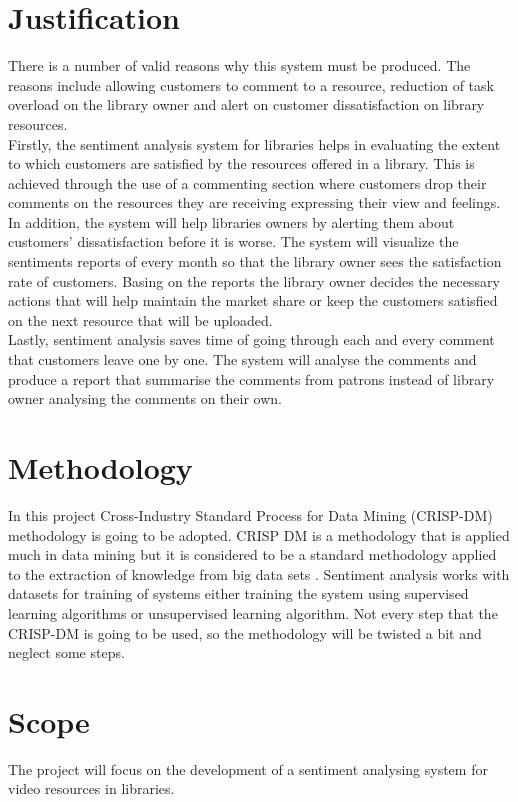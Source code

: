 \documentclass[12pt]{report}
\begin{document}
	\section{Justification}
	There is a number of valid reasons why this system must be produced. The reasons include allowing customers to comment to a resource, reduction of task overload on the library owner and alert on customer dissatisfaction on library resources.\\
	Firstly, the sentiment analysis system for libraries helps in evaluating the extent to which customers are satisfied by the resources offered in a library. This is achieved through the use of a commenting section where customers drop their comments on the resources they are receiving expressing their view and feelings.\\
	In addition, the system will help libraries owners by alerting them about customers’ dissatisfaction before it is worse. The system will visualize the sentiments reports of every month so that the library owner sees the satisfaction rate of customers. Basing on the reports the library owner decides the necessary actions that will help maintain the market share or keep the customers satisfied on the next resource that will be uploaded.\\
	Lastly, sentiment analysis saves time of going through each and every comment that customers leave one by one. The system will analyse the comments and produce a report that summarise the comments from patrons instead of library owner analysing the comments on their own.
	
	\section{Methodology}
	In this project Cross-Industry Standard Process for Data Mining (CRISP-DM) methodology is going to be adopted. CRISP DM is a methodology that is applied much in data mining but it is considered to be a standard methodology applied to the extraction of knowledge from big data sets \citep{sharda2016business}. Sentiment analysis works with datasets for training of systems either training the system using supervised learning algorithms or unsupervised learning algorithm. Not every step that the CRISP-DM is going to be used, so the methodology will be twisted a bit and neglect some steps.	
	
	\section{Scope}
	The project will focus on the development of a sentiment analysing system for video resources in libraries.
\end{document}
